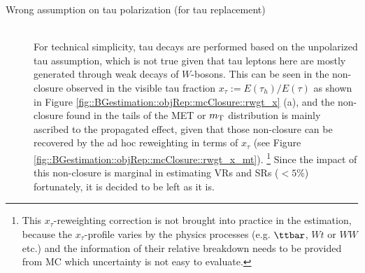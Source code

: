 \begin{description}
\item [Wrong assumption on tau polarization (for tau replacement)] \mbox{} \\
For technical simplicity, tau decays are performed based on the unpolarized tau assumption, which is not true given that tau leptons here are mostly generated through weak decays of $W$-bosons. 
This can be seen in the non-closure observed in the visible tau fraction $x_{\tau} := E(\tau_{h})/E(\tau)$ as shown in Figure \ref{fig::BGestimation::objRep::mcClosure::rwgt_x} (a), and the non-closure found in the tails of the MET or $m_{\mathrm{T}}$ distribution is mainly ascribed to the propagated effect, given that those non-closure can be recovered by the ad hoc reweighting in terms of $x_{\tau}$ (see Figure \ref{fig::BGestimation::objRep::mcClosure::rwgt_x_mt}).
\footnote{This $x_{\tau}$-reweighting correction is not brought into practice in the estimation, because the $x_{\tau}$-profile varies by the physics processes (e.g. $\ttbar$, $Wt$ or $WW$ etc.) and the information of their relative breakdown needs to be provided from MC which uncertainty is not easy to evaluate.}
Since the impact of this non-closure is marginal in estimating VRs and SRs ($<5\%$) fortunately, it is decided to be left as it is.


\end{description}
